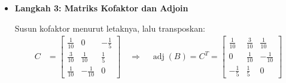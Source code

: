 \documentclass[10pt,a4paper]{article}
\begin{document}
\begin{enumerate}
\begin{enumerate}
\begin{itemize}
Baris pertama memakai minor dari Langkah 1; baris lainnya dihitung dengan cara yang sama:
\begin{align}
C_{11} &= +M_{11} = \frac{1}{10}, \qquad C_{12} = -M_{12} = 0, \qquad C_{13} = +M_{13} = -\frac{1}{5} \nonumber \\
C_{21} &= -\begin{vmatrix} \frac{1}{5} & -\frac{2}{5} \\ -\frac{4}{5} & \frac{1}{10} \end{vmatrix} = -\left(\frac{1}{50} - \frac{16}{50}\right) = \frac{3}{10} \nonumber \\
C_{22} &= +\begin{vmatrix} \frac{1}{5} & -\frac{2}{5} \\ \frac{1}{5} & \frac{1}{10} \end{vmatrix} = \frac{1}{50} + \frac{4}{50} = \frac{1}{10} \nonumber \\
C_{23} &= -\begin{vmatrix} \frac{1}{5} & \frac{1}{5} \\ \frac{1}{5} & -\frac{4}{5} \end{vmatrix} = -\left(-\frac{4}{25} - \frac{1}{25}\right) = \frac{1}{5} \nonumber \\
C_{31} &= +\begin{vmatrix} \frac{1}{5} & -\frac{2}{5} \\ \frac{1}{5} & \frac{1}{10} \end{vmatrix} = \frac{1}{50} + \frac{4}{50} = \frac{1}{10} \nonumber \\
C_{32} &= -\begin{vmatrix} \frac{1}{5} & -\frac{2}{5} \\ \frac{1}{5} & \frac{1}{10} \end{vmatrix} = -\frac{1}{10} \nonumber \\
C_{33} &= +\begin{vmatrix} \frac{1}{5} & \frac{1}{5} \\ \frac{1}{5} & \frac{1}{5} \end{vmatrix} = \frac{1}{25} - \frac{1}{25} = 0 \nonumber
\end{align}

\item \textbf{Langkah 3: Matriks Kofaktor dan Adjoin}

Susun kofaktor menurut letaknya, lalu transposkan:
\begin{align}
C &= \begin{bmatrix} \frac{1}{10} & 0 & -\frac{1}{5} \\ \frac{3}{10} & \frac{1}{10} & \frac{1}{5} \\ \frac{1}{10} & -\frac{1}{10} & 0 \end{bmatrix}
\quad\Rightarrow\quad
\operatorname{adj}(B) = C^T = \begin{bmatrix} \frac{1}{10} & \frac{3}{10} & \frac{1}{10} \\ 0 & \frac{1}{10} & -\frac{1}{10} \\ -\frac{1}{5} & \frac{1}{5} & 0 \end{bmatrix}
\end{align}


\end{itemize}
\end{enumerate}
\end{enumerate}
\end{document}
